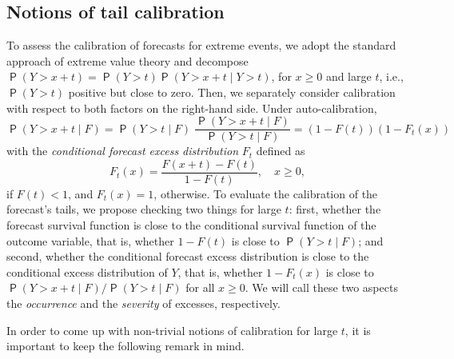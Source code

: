 \documentclass[12pt]{article}
\newcommand{\Q}{\operatorname{\mathsf{P}}}
\newcommand{\1}{\mathbf{1}} %
\theoremstyle{definition}
\begin{document}
\subsection{Notions of tail calibration}
\label{sec:tailcalib}

To assess the calibration of forecasts for extreme events, we adopt the standard approach of extreme value theory and decompose $\Q(Y> x+t ) = \Q(Y > t) \Q(Y > x+t \mid Y > t)$, 
for $x \ge 0$ and large $t$, i.e., $\Q(Y > t)$ positive but close to zero. Then, we separately consider calibration with respect to both factors on the right-hand side. Under auto-calibration, %
\[
\Q(Y > x+t \mid F) = \Q(Y>t \mid F)\; \frac{\Q(Y>x+t \mid F)}{\Q(Y > t \mid F)} = (1-F(t)) (1-F_t(x))
\]
with the \emph{conditional forecast excess distribution} $F_t$ defined as
\begin{equation}
\label{eq:Ftx}
F_{t}(x) = \frac{F(x + t) - F(t)}{1-F(t)}, \quad x \ge 0,
\end{equation}
if $F(t) < 1$, and $F_t(x) = 1$, otherwise.
To evaluate the calibration of the forecast's tails, we propose checking two things for large $t$: first, whether the forecast survival function is close to the conditional survival function of the outcome variable, that is, whether $1-F(t)$ is close to $\Q(Y>t \mid F)$; and second, whether the conditional forecast excess distribution is close to the conditional excess distribution of $Y$, that is, whether $1-F_t(x)$ is close to $\Q(Y>x+t \mid F)/\Q(Y > t \mid F)$ for all $x \ge 0$. We will call these two aspects the \emph{occurrence} and the \emph{severity} of excesses, respectively.

In order to come up with non-trivial notions of calibration for large $t$, it is important to keep the following remark in mind.
\end{document}
